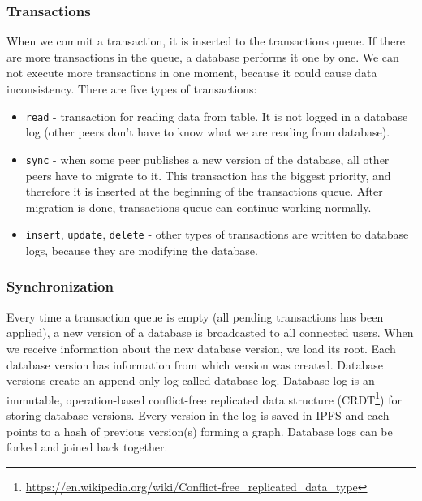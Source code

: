 \subsubsection{Transactions}
When we commit a transaction, it is inserted to the transactions queue. If there are more transactions in the queue, a database performs it one by one. We can not execute more transactions in one moment, because it could cause data inconsistency. There are five types of transactions:
\begin{itemize}
    \item \texttt{read} - transaction for reading data from table. It is not logged in a database log (other peers don't have to know what we are reading from database).
    \item \texttt{sync} - when some peer publishes a new version of the database, all other peers have to migrate to it. This transaction has the biggest priority, and therefore it is inserted at the beginning of the transactions queue. After migration is done, transactions queue can continue working normally.
    \item \texttt{insert}, \texttt{update}, \texttt{delete} - other types of transactions are written to database logs, because they are modifying the database.
\end{itemize}

\subsubsection{Synchronization} 
\label{designSync}
Every time a transaction queue is empty (all pending transactions has been applied), a new version of a database is broadcasted to all connected users. When we receive information about the new database version, we load its root. Each database version has information from which version was created. Database versions create an append-only log called database log. Database log is an immutable, operation-based conflict-free replicated data structure (CRDT\footnote{\url{https://en.wikipedia.org/wiki/Conflict-free_replicated_data_type}}) for storing database versions. Every version in the log is saved in IPFS and each points to a hash of previous version(s) forming a graph. Database logs can be forked and joined back together.\cite{crdtLog}

